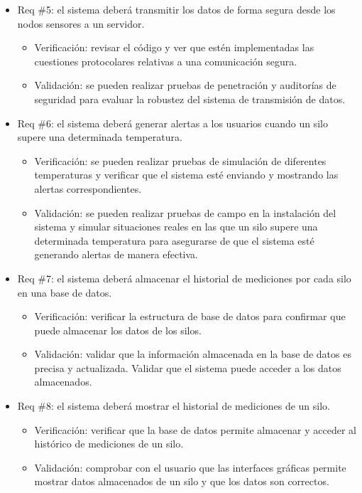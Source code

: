 \documentclass[
11pt, %
]{charter}
\begin{document}
\begin{itemize}
\item Req \#5: el sistema deberá transmitir los datos de forma segura desde los nodos sensores a un
servidor.
\begin{itemize}
	\item Verificación:  revisar el código y ver que estén implementadas las cuestiones protocolares relativas a una comunicación segura.
	\item Validación: se pueden realizar pruebas de penetración y auditorías de seguridad para evaluar la robustez del sistema de transmisión de datos.
\end{itemize}

\item Req \#6: el sistema deberá generar alertas a los usuarios cuando un silo supere una determinada temperatura.
\begin{itemize}
	\item Verificación: se pueden realizar pruebas de simulación de diferentes temperaturas y verificar que el sistema esté enviando y mostrando las alertas correspondientes. 
	\item Validación: se pueden realizar pruebas de campo en la instalación del sistema y simular situaciones reales en las que un silo supere una determinada temperatura para asegurarse de que el sistema esté generando alertas de manera efectiva.
\end{itemize}

\item Req \#7: el sistema deberá almacenar el historial de mediciones por cada silo en una base de
datos.
\begin{itemize}
	\item Verificación: verificar la estructura de base de datos para confirmar que puede almacenar los datos de los silos.
	\item Validación: validar que la información almacenada en la base de datos es precisa y actualizada. Validar que el sistema puede acceder a los datos almacenados. 
\end{itemize}

\item Req \#8: el sistema deberá mostrar el historial de mediciones de un silo.
\begin{itemize}
	\item Verificación: verificar que la base de datos permite almacenar y acceder al histórico de mediciones de un silo.
	\item Validación: comprobar con el usuario que las interfaces gráficas permite mostrar datos almacenados de un silo y que los datos son correctos. 
\end{itemize}


\end{itemize}
\end{document}
